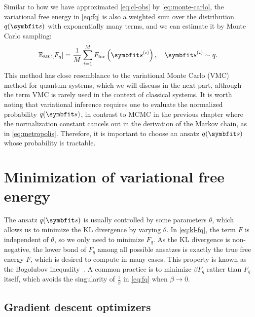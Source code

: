 Similar to how we have approximated \cref{eq:cl-obs} by \cref{eq:monte-carlo}, the variational free energy in \cref{eq:fq} is also a weighted sum over the distribution $q(\vs)$ with exponentially many terms, and we can estimate it by Monte Carlo sampling:
\begin{equation}
\bbE_\text{MC}[F_q] = \frac{1}{M} \sum_{i = 1}^M F_\text{loc}\left( \vs^{(i)} \right), \quad
\vs^{(i)} \sim q.
\label{eq:fq-monte-carlo}
\end{equation}
This method has close resemblance to the variational Monte Carlo (VMC) method for quantum systems, which we will discuss in the next part, although the term VMC is rarely used in the context of classical systems. It is worth noting that variational inference requires one to evaluate the normalized probability $q(\vs)$, in contrast to MCMC in the previous chapter where the normalization constant cancels out in the derivation of the Markov chain, as in \cref{eq:metropolis}. Therefore, it is important to choose an ansatz $q(\vs)$ whose probability is tractable.

\section{Minimization of variational free energy}

The ansatz $q(\vs)$ is usually controlled by some parameters $\theta$, which allows us to minimize the KL divergence by varying $\theta$. In \cref{eq:kl-fq}, the term $F$ is independent of $\theta$, so we only need to minimize $F_q$. As the KL divergence is non-negative, the lower bond of $F_q$ among all possible ansatzes is exactly the true free energy $F$, which is desired to compute in many cases. This property is known as the Bogolubov inequality~\cite{bogolubov1966model}. A common practice is to minimize $\beta F_q$ rather than $F_q$ itself, which avoids the singularity of $\frac{1}{\beta}$ in \cref{eq:fq} when $\beta \to 0$.

\subsection{Gradient descent optimizers}
\label{sec:gd}

